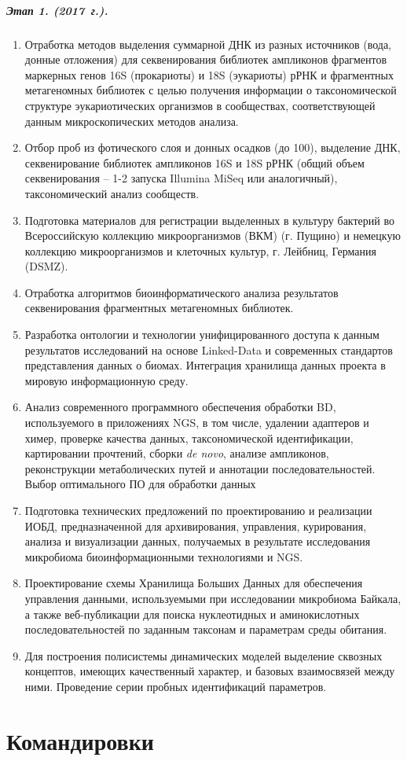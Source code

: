 \documentclass[a4paper,12pt,openany,final]{extreport}
\makeatletter
\newcommand\theyear{2017}
\def\vhrulefill#1{\leavevmode\leaders\hrule\@height#1\hfill \kern\z@}
\newcommand\bottomrule{\noindent\vhrulefill{2pt}}
\makeatother
\begin{document}
\paragraph{Этап 1. (\theyear~г.).}
\begin{enumerate}
\item Отработка методов выделения суммарной ДНК из разных
  источников (вода, донные отложения) для секвенирования библиотек
  ампликонов фрагментов маркерных генов 16S (прокариоты) и 18S
  (эукариоты) рРНК и фрагментных метагеномных библиотек с целью
  получения информации о таксономической структуре эукариотических
  организмов в сообществах, соответствующей данным микроскопических
  методов анализа.

\item  Отбор проб из фотического слоя и донных осадков (до 100), выделение
ДНК, секвенирование библиотек ампликонов 16S и 18S рРНК (общий объем
секвенирования -- 1-2 запуска Illumina MiSeq или аналогичный),
таксономический анализ сообществ.

\item  Подготовка материалов для регистрации выделенных в культуру бактерий
во Всероссийскую коллекцию микроорганизмов (ВКМ) (г. Пущино) и немецкую
коллекцию микроорганизмов и клеточных культур, г. Лейбниц, Германия
(DSMZ).

\item Отработка алгоритмов биоинформатического анализа результатов
секвенирования фрагментных метагеномных библиотек.

\item  Разработка онтологии и технологии унифицированного доступа к данным
результатов исследований на основе Linked-Data и современных стандартов
представления данных о биомах. Интеграция хранилища данных проекта в
мировую информационную среду.

\item  Анализ современного программного обеспечения обработки BD,
используемого в приложениях NGS, в том числе, удалении адаптеров и
химер, проверке качества данных, таксономической идентификации,
картировании прочтений, сборки \textit{de novo}, анализе ампликонов,
реконструкции метаболических путей и аннотации последовательностей.
Выбор оптимального ПО для обработки данных

\item  Подготовка технических предложений по проектированию и реализации
ИОБД, предназначенной для архивирования, управления, курирования,
анализа и визуализации данных, получаемых в результате исследования
микробиома биоинформационными технологиями и NGS.

\item  Проектирование схемы Хранилища Больших Данных для обеспечения
управления данными, используемыми при исследовании микробиома Байкала, а
также веб-публикации для поиска нуклеотидных и аминокислотных
последовательностей по заданным таксонам и параметрам среды обитания.

\item  Для построения полисистемы динамических моделей выделение сквозных
концептов, имеющих качественный характер, и базовых взаимосвязей между
ними. Проведение серии пробных идентификаций параметров.\strut
\end{enumerate}


\chapter{Командировки}
\label{chap:comm}
\end{document}

